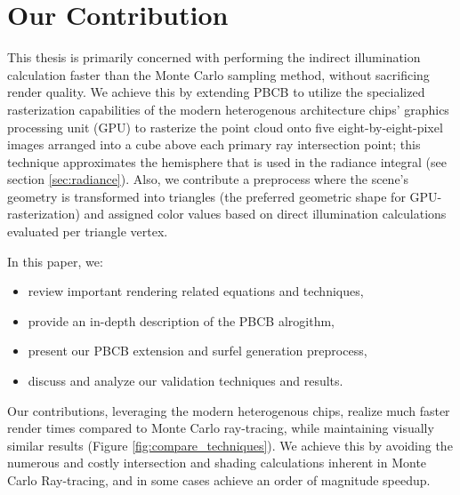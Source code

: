 \section{Our Contribution}
This thesis is primarily concerned with performing the indirect illumination calculation faster than the Monte Carlo sampling method, without sacrificing render quality. We achieve this by extending PBCB to utilize the specialized rasterization capabilities of the modern heterogenous architecture chips' graphics processing unit (GPU) to rasterize the point cloud onto five eight-by-eight-pixel images arranged into a cube above each primary ray intersection point; this technique approximates the hemisphere that is used in the radiance integral (see section \ref{sec:radiance}). Also, we contribute a preprocess where the scene's geometry is transformed into triangles (the preferred geometric shape for GPU-rasterization) and assigned color values based on direct illumination calculations evaluated per triangle vertex.

\noindent In this paper, we:
\begin{itemize}
\item review important rendering related equations and techniques,
\item provide an in-depth description of the PBCB alrogithm,
\item present our PBCB extension and surfel generation preprocess,
\item discuss and analyze our validation techniques and results.
\end{itemize}

Our contributions, leveraging the modern heterogenous chips, realize much faster render times compared to Monte Carlo ray-tracing, while maintaining visually similar results (Figure \ref{fig:compare_techniques}). We achieve this by avoiding the numerous and costly intersection and shading calculations inherent in Monte Carlo Ray-tracing, and in some cases achieve an order of magnitude speedup.

